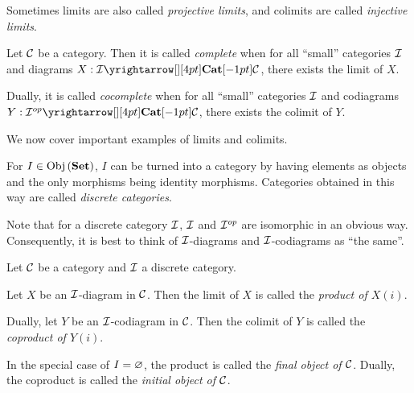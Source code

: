 \begin{rmk}
  Sometimes limits are also called \emph{projective limits},
  and colimits are called \emph{injective limits}. 
\end{rmk}

\begin{dfn}[(Co)Completeness]
  
  Let $\mathcal{C}$ be a category. 
  Then it is called \emph{complete} when 
  for all ``small'' categories $\mathcal{I}$ and diagrams $X : \map{\II}{\CC}{\CAT}{}$,
  there exists the limit of $X$.

  Dually, it is called \emph{cocomplete} when 
  for all ``small'' categories $\mathcal{I}$ and 
  codiagrams $Y : \map{\II\op}{\CC}{\CAT}{}$,
  there exists the colimit of $Y$.
\end{dfn}

\begin{rmk}
  We now cover important examples of limits and colimits. 
\end{rmk}

\begin{dfn}
  
  For $I \in \mathrm{Obj}\left(\mathbf{Set}\right)$, 
  $I$ can be turned into a category by having elements as objects 
  and the only morphisms being identity morphisms. 
  Categories obtained in this way are called \emph{discrete categories}.
\end{dfn}

\begin{rmk}
  Note that for a discrete category $\mathcal{I}$,
  $\mathcal{I}$ and $\mathcal{I}^{op}$ are isomorphic in an obvious way. 
  Consequently, it is best to think of 
  $\mathcal{I}$-diagrams and $\mathcal{I}$-codiagrams as ``the same''.
\end{rmk}

\begin{dfn}[(Co)Products]
  
  Let $\mathcal{C}$ be a category and $\mathcal{I}$ a discrete category. 

  Let $X$ be an $\mathcal{I}$-diagram in $\mathcal{C}$.
  Then the limit of $X$ is called the \emph{product of $X(i)$}.

  Dually, let $Y$ be an $\mathcal{I}$-codiagram in $\mathcal{C}$.
  Then the colimit of $Y$ is called the \emph{coproduct of $Y(i)$}.

  In the special case of $I = \varnothing$, 
  the product is called the \emph{final object of $\mathcal{C}$}.
  Dually, the coproduct is called the \emph{initial object of $\mathcal{C}$}.
\end{dfn}

